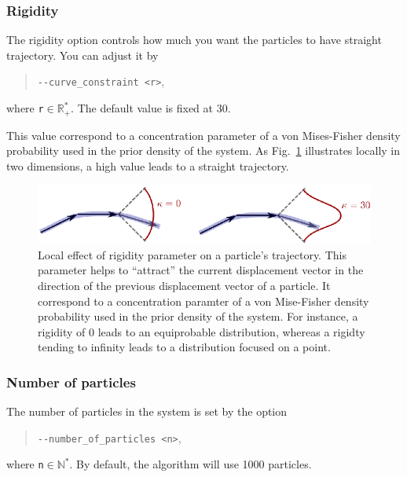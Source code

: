     \subsubsection*{Rigidity}
        The rigidity option controls how much you want the particles to have straight trajectory. You can adjust it by
            \begin{quote}
                \texttt{-\hspace{0.1mm}-curve_constraint <r>},
            \end{quote}
        where \texttt{r}$\in\mathbb{R}_+^*$. The default value is fixed at 30.

        This value correspond to a concentration parameter of a von Mises-Fisher density probability used in the prior density of the system. As Fig.~\ref{tracto-fig:concentration} illustrates locally in two dimensions, a high value leads to a straight trajectory.

        \begin{figure}
            \centering
            \includegraphics[height=0.1\textheight]{concentration}
            \caption{Local effect of rigidity parameter on a particle's trajectory. This parameter helps to ``attract'' the current displacement vector in the direction of the previous displacement vector of a particle. It correspond to a concentration paramter of a von Mise-Fisher density probability used in the prior density of the system. For instance, a rigidity of 0 leads to an equiprobable distribution, whereas a rigidty tending to infinity leads to a distribution focused on a point.}
            \label{tracto-fig:concentration}
        \end{figure}


    \subsubsection*{Number of particles}
        The number of particles in the system is set by the option
            \begin{quote}
                \texttt{-\hspace{0.1mm}-number_of_particles <n>},
            \end{quote}
        where \texttt{n}$\in\mathbb{N}^*$. By default, the algorithm will use 1000 particles.

